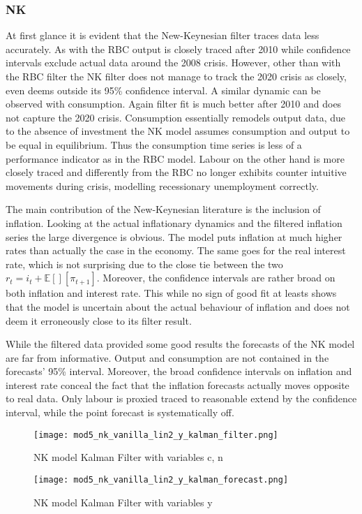 \documentclass[12pt,a4paper,english]{article} %
\newcommand{\E}{\mathbb{E}} %
\begin{document}
	\subsubsection{NK}
	At first glance it is evident that the New-Keynesian filter traces data less accurately. As with the RBC output is closely traced after 2010 while confidence intervals exclude actual data around the 2008 crisis. However, other than with the RBC filter the NK filter does not manage to track the 2020 crisis as closely, even deems outside its 95\% confidence interval.
	A similar dynamic can be observed with consumption. Again filter fit is much better after 2010 and does not capture the 2020 crisis. Consumption essentially remodels output data, due to the absence of investment the NK model assumes consumption and output to be equal in equilibrium. Thus the consumption time series is less of a performance indicator as in the RBC model.
	Labour on the other hand is more closely traced and differently from the RBC no longer exhibits counter intuitive movements during crisis, modelling recessionary unemployment correctly. 
	
	The main contribution of the New-Keynesian literature is the inclusion of inflation. Looking at the actual inflationary dynamics and the filtered inflation series the large divergence is obvious. The model puts inflation at much higher rates than actually the case in the economy. The same goes for the real interest rate, which is not surprising due to the close tie between the two $r_t = i_t + \E[][\pi_{t+1}]$. Moreover, the confidence intervals are rather broad on both inflation and interest rate. This while no sign of good fit at leasts shows that the model is uncertain about the actual behaviour of inflation and does not deem it erroneously close to its filter result.
	
	While the filtered data provided some good results the forecasts of the NK model are far from informative. Output and consumption are not contained in the forecasts' 95\% interval. Moreover, the broad confidence intervals on inflation and interest rate conceal the fact that the inflation forecasts actually moves opposite to real data. Only labour is proxied traced to reasonable extend by the confidence interval, while the point forecast is systematically off.
	
	\begin{figure}[H]
		\begin{center}
			\texttt{[image: mod5\_nk\_vanilla\_lin2\_y\_kalman\_filter.png]}
			\caption{NK model Kalman Filter with variables c, n}\label{fig:nk_kfil}
			\texttt{[image: mod5\_nk\_vanilla\_lin2\_y\_kalman\_forecast.png]}
			\caption{NK model Kalman Filter with variables y}\label{fig:nk_kfor}
		\end{center}
	\end{figure}
	
\end{document}

